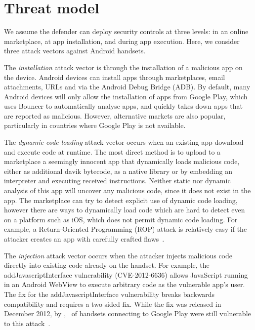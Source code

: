 \documentclass{sig-alternate-2013}
\begin{document}
\section{Threat model}
\label{sec:threatmodel}

We assume the defender can deploy security controls at three levels: in an online marketplace, at app installation, and during app execution.
Here, we consider three attack vectors against Android handsets.

The \emph{installation} attack vector is through the installation of a malicious app on the device.
Android devices can install apps through marketplaces, email attachments, URLs and via the Android Debug Bridge (ADB).
By default, many Android devices will only allow the installation of apps from Google Play, which uses Bouncer to automatically analyse apps, and quickly takes down apps that are reported as malicious.
However, alternative markets are also popular, particularly in countries where Google Play is not available.

The \emph{dynamic code loading} attack vector occurs when an existing app download and execute code at runtime.
The most direct method is to upload to a marketplace a seemingly innocent app that dynamically loads malicious code, either as additional davik bytecode, as a native library or by embedding an interpreter and executing received instructions.
Neither static nor dynamic analysis of this app will uncover any malicious code, since it does not exist in the app.
The marketplace can try to detect explicit use of dynamic code loading, however there are ways to dynamically load code which are hard to detect even on a platform such as iOS, which does not permit dynamic code loading.
For example, a Return-Oriented Programming (ROP) attack is relatively easy if the attacker creates an app with carefully crafted flaws~\cite{Wang2013a}.

The \emph{injection} attack vector occurs when the attacker injects malicious code directly into existing code already on the handset. 
For example, the addJavascriptInterface vulnerability (CVE-2012-6636) allows JavaScript running in an Android WebView to execute arbitrary code as the vulnerable app's user.
The fix for the addJavascriptInterface vulnerability breaks backwards compatibility and requires a two sided fix.
While the fix was released in December 2012, by \daGPAPISeventeenLaterDateMonth, \daGPAPISeventeenEarlierProportion\ of handsets connecting to Google Play were still vulnerable to this attack~\cite{Thomas2015a}.
\end{document}
